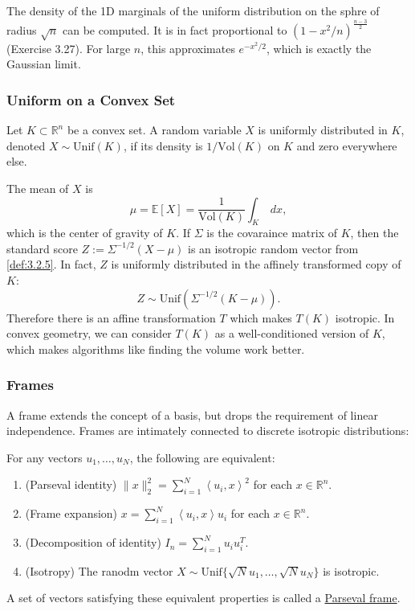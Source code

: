 \begin{remark}
\label{rmk:3.3.10}
The density of the 1D marginals of the uniform distribution on the sphre of radius $\sqrt{n}$ can be 
computed. It is in fact proportional to $(1 - x^2 / n)^{\frac{n-3}{2}}$ (Exercise 3.27). For large $n$, 
this approximates $e^{-x^2 / 2}$, which is exactly the Gaussian limit.
\end{remark}


\subsubsection{Uniform on a Convex Set}
Let $K \subset \mathbb{R}^n$ be a convex set. A random variable $X$ is uniformly distributed 
in $K$, denoted $X \sim \mathrm{Unif}(K)$, if its density is $1/\mathrm{Vol}(K)$ on $K$ and zero everywhere 
else.

The mean of $X$ is 
\[ \mu = \mathbb{E}[X] = \frac{1}{\mathrm{Vol}(K)} \int_{K}^{}  \ dx, \]
which is the center of gravity of $K$. If $\Sigma$ is the covaraince matrix of $K$, then the standard score 
$Z := \Sigma^{-1/2}(X - \mu)$ is an isotropic random vector from \cref{def:3.2.5}. In fact, $Z$ is uniformly 
distributed in the affinely transformed copy of $K$: 
\[ Z \sim \mathrm{Unif}\left( \Sigma^{-1/2}(K - \mu) \right). \]
Therefore there is an affine transformation $T$ which makes $T(K)$ isotropic. In convex geometry, we can 
consider $T(K)$ as a well-conditioned version of $K$, which makes algorithms like finding the volume work 
better.


\subsubsection{Frames}
A frame extends the concept of a basis, but drops the requirement of linear independence. Frames are intimately 
connected to discrete isotropic distributions: 
\begin{proposition}
\label{prop:3.3.11}
For any vectors $u_1, \dots, u_N$, the following are equivalent: 
\begin{enumerate}[label=(\roman*)]
	\item (Parseval identity) $\lVert x \rVert_{2}^2 = \sum_{i = 1}^{N} \left\langle u_i, x \right\rangle^2$ 
	for each $x \in \mathbb{R}^n$.
	\item (Frame expansion) $x = \sum_{i = 1}^{N} \left\langle u_i, x \right\rangle u_i$ for each $x \in 
	\mathbb{R}^n$.
	\item (Decomposition of identity) $I_n = \sum_{i = 1}^{N} u_i u_i^T$.
	\item (Isotropy) The ranodm vector $X \sim \mathrm{Unif}\{\sqrt{N}u_1, \dots, \sqrt{N}u_N\}$ is isotropic.
\end{enumerate}
A set of vectors satisfying these equivalent properties is called a \underline{Parseval frame}.
\end{proposition}

